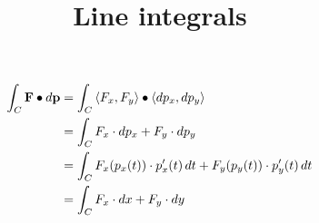 \documentclass{ximera}
\title[Dig-In:]{Line integrals}
\begin{document}
\begin{abstract}
\end{abstract}
\maketitle


\begin{align*}
  \int_C \vec{F}\dotp \d \vec{p} &= \int_C \vector{F_x,F_y}\dotp\vector{\d p_x,\d p_y}\\
  &= \int_C F_x\cdot \d p_x + F_y\cdot \d p_y\\
  &= \int_C F_x(p_x(t))\cdot p'_x(t) \d t + F_y(p_y(t))\cdot  p'_y(t) \d t\\
  &= \int_C F_x\cdot \d x  + F_y\cdot  \d y
\end{align*}
\end{document}

